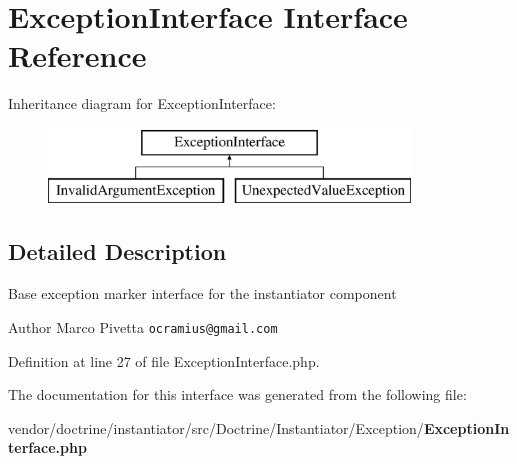 \section{Exception\+Interface Interface Reference}
\label{interface_doctrine_1_1_instantiator_1_1_exception_1_1_exception_interface}
Inheritance diagram for Exception\+Interface\+:\begin{figure}[H]
\begin{center}
\leavevmode
\includegraphics[height=2.000000cm]{interface_doctrine_1_1_instantiator_1_1_exception_1_1_exception_interface}
\end{center}
\end{figure}


\subsection{Detailed Description}
Base exception marker interface for the instantiator component

\begin{DoxyAuthor}{Author}
Marco Pivetta {\tt ocramius@gmail.\+com} 
\end{DoxyAuthor}


Definition at line 27 of file Exception\+Interface.\+php.



The documentation for this interface was generated from the following file\+:\begin{DoxyCompactItemize}
\item 
vendor/doctrine/instantiator/src/\+Doctrine/\+Instantiator/\+Exception/{\bf Exception\+Interface.\+php}\end{DoxyCompactItemize}

